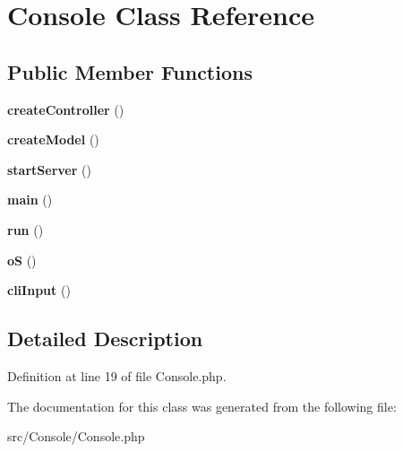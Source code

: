 \hypertarget{class_zest_1_1_console_1_1_console}{}\section{Console Class Reference}
\label{class_zest_1_1_console_1_1_console}
\subsection*{Public Member Functions}
\begin{DoxyCompactItemize}
\item 
\mbox{\label{class_zest_1_1_console_1_1_console_ab4858765ddebc2a3c6ea8081b23ff61b}} 
{\bfseries create\+Controller} ()
\item 
\mbox{\label{class_zest_1_1_console_1_1_console_a0ed924cc869985de5bfd963b245b6fff}} 
{\bfseries create\+Model} ()
\item 
\mbox{\label{class_zest_1_1_console_1_1_console_a1721a545f9a1651e62e970e275a28a5c}} 
{\bfseries start\+Server} ()
\item 
\mbox{\label{class_zest_1_1_console_1_1_console_a51af30a60f9f02777c6396b8247e356f}} 
{\bfseries main} ()
\item 
\mbox{\label{class_zest_1_1_console_1_1_console_afb0fafe7e02a3ae1993c01c19fad2bae}} 
{\bfseries run} ()
\item 
\mbox{\label{class_zest_1_1_console_1_1_console_a7b69fa3dab2df43876025e8a02e4bbea}} 
{\bfseries oS} ()
\item 
\mbox{\label{class_zest_1_1_console_1_1_console_a081299c8b0ca77ca1fc29c0f25748d55}} 
{\bfseries cli\+Input} ()
\end{DoxyCompactItemize}


\subsection{Detailed Description}


Definition at line 19 of file Console.\+php.



The documentation for this class was generated from the following file\+:\begin{DoxyCompactItemize}
\item 
src/\+Console/Console.\+php\end{DoxyCompactItemize}
